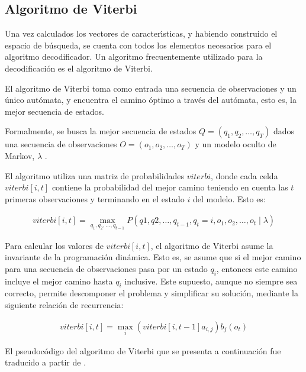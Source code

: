 \subsection{Algoritmo de Viterbi}
Una vez calculados los vectores de caracter{\'\i}sticas, y habiendo construido el espacio de b\'usqueda, 
se cuenta con todos los elementos necesarios para el algoritmo decodificador. Un algoritmo frecuentemente 
utilizado para la decodificaci\'on es el algoritmo de Viterbi.

El algoritmo de Viterbi toma como entrada una secuencia de observaciones y un \'unico aut\'omata, 
y encuentra el camino \'optimo a trav\'es del aut\'omata, esto es, la mejor secuencia de estados. 

Formalmente, se busca la mejor secuencia de estados $Q = (q_1,q_2,\ldots,q_T)$ 
dados una secuencia de observaciones $O = (o_1,o_2,\ldots,o_T)$ y un modelo oculto de 
Markov, $\lambda$ \cite{Jurafsky}.

El algoritmo utiliza una matriz de probabilidades $viterbi$, donde cada celda $viterbi[i,t]$ 
contiene la probabilidad del mejor camino teniendo en cuenta las $t$ primeras observaciones y 
terminando en el estado $i$ del modelo. Esto es:

\begin{align}
	viterbi[i,t] = \displaystyle \max_{q_1,q_2,\ldots,q_{t - 1}} P(q1,q2,\ldots,q_{t - 1},
		q_t = i,o_1,o_2,\ldots,o_t \mid \lambda) 	
\end{align} 

Para calcular los valores de $viterbi[i,t]$, el algoritmo de Viterbi asume la invariante de la 
programaci\'on din\'amica. Esto es, se asume que si el mejor camino para una secuencia de observaciones 
pasa por un estado $q_i$, entonces este camino incluye el mejor camino hasta $q_i$ inclusive. 
Este supuesto, aunque no siempre sea correcto, permite descomponer el problema y simplificar su soluci\'on,
mediante la siguiente relaci\'on de recurrencia:

\begin{align}
	viterbi[i,t] = \displaystyle \max_i (viterbi[i,t-1]a_{i,j})b_j(o_t)
\end{align}

El pseudoc\'odigo del algoritmo de Viterbi que se presenta a continuaci\'on fue traducido a 
partir de \cite{Rabiner89atutorial, Jurafsky}.

